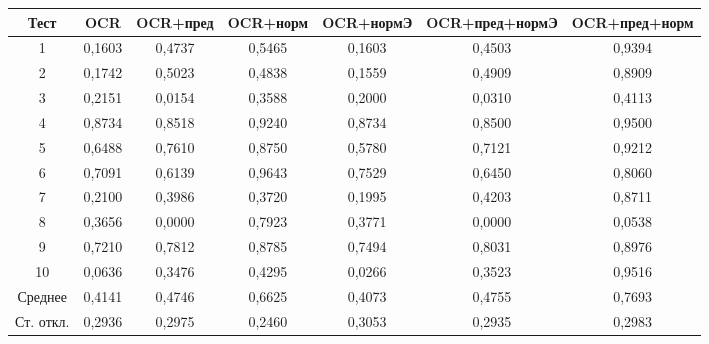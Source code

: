 \begin{tabular}{c c c c c c c}
	\hline
	Тест & OCR & OCR+пред & OCR+норм & OCR+нормЭ & OCR+пред+нормЭ & OCR+пред+норм \\
	\hline
	1  & 0,1603 & 0,4737 & 0,5465 & 0,1603 & 0,4503 & 0,9394 \\
	2  & 0,1742 & 0,5023 & 0,4838 & 0,1559 & 0,4909 & 0,8909 \\
	3  & 0,2151 & 0,0154 & 0,3588 & 0,2000 & 0,0310 & 0,4113 \\
	4  & 0,8734 & 0,8518 & 0,9240 & 0,8734 & 0,8500 & 0,9500 \\
	5  & 0,6488 & 0,7610 & 0,8750 & 0,5780 & 0,7121 & 0,9212 \\
	6  & 0,7091 & 0,6139 & 0,9643 & 0,7529 & 0,6450 & 0,8060 \\
	7  & 0,2100 & 0,3986 & 0,3720 & 0,1995 & 0,4203 & 0,8711 \\
	8  & 0,3656 & 0,0000 & 0,7923 & 0,3771 & 0,0000 & 0,0538 \\
	9  & 0,7210 & 0,7812 & 0,8785 & 0,7494 & 0,8031 & 0,8976 \\
	10 & 0,0636 & 0,3476 & 0,4295 & 0,0266 & 0,3523 & 0,9516 \\
	\hline
	Среднее & 0,4141 & 0,4746 & 0,6625 & 0,4073 & 0,4755 & 0,7693 \\
	Ст. откл. & 0,2936 & 0,2975 & 0,2460 & 0,3053 & 0,2935 & 0,2983 \\
	\hline
\end{tabular}